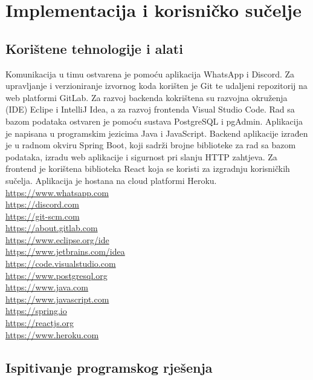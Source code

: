\chapter{Implementacija i korisničko sučelje}
		
		
		\section{Korištene tehnologije i alati}
		
		
			Komunikacija u timu ostvarena je pomoću aplikacija WhatsApp i Discord. Za upravljanje i verzioniranje izvornog koda korišten je Git te udaljeni repozitorij na web platformi GitLab.
			\vspace{3mm}
Za razvoj backenda kokrištena su razvojna okruženja (IDE) Eclipe i IntelliJ Idea, a za razvoj frontenda Visual Studio Code. Rad sa bazom podataka ostvaren je pomoću sustava PostgreSQL i pgAdmin. Aplikacija je napisana u programskim jezicima Java i JavaScript.
\vspace{3mm}
Backend aplikacije izrađen je u radnom okviru Spring Boot, koji sadrži brojne biblioteke za rad sa bazom podataka, izradu web aplikacije i sigurnost pri slanju HTTP zahtjeva. Za frontend je korištena biblioteka React koja se koristi za izgradnju korisničkih sučelja.
Aplikacija je hostana na cloud platformi Heroku. \\


\url{https://www.whatsapp.com} \\
\url{https://discord.com} \\
\url{https://git-scm.com} \\
\url{https://about.gitlab.com} \\
\url{https://www.eclipse.org/ide} \\
\url{https://www.jetbrains.com/idea} \\
\url{https://code.visualstudio.com} \\
\url{https://www.postgresql.org} \\
\url{https://www.java.com} \\
\url{https://www.javascript.com} \\
\url{https://spring.io} \\
\url{https://reactjs.org} \\
\url{https://www.heroku.com} \\
		
			\eject 
		
	
		\section{Ispitivanje programskog rješenja}
			
